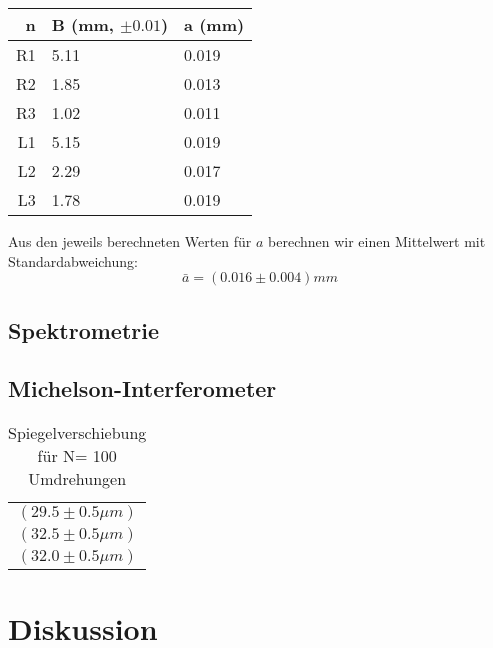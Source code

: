 \documentclass{article}
\begin{document}
\begin{center}
\begin{tabular}{|r|l|l|}
n & B (mm, $\pm 0.01$) & a (mm)\\
\hline
R1 & 5.11 & 0.019\\
R2 & 1.85 & 0.013\\
R3 & 1.02 & 0.011\\
L1 & 5.15 & 0.019\\
L2 & 2.29 & 0.017\\
L3 & 1.78 & 0.019\\
\end{tabular}

\end{center}
\vspace{1cm}
Aus den jeweils berechneten Werten für $a$ berechnen wir einen Mittelwert mit Standardabweichung:
$$\bar{a}=(0.016 \pm 0.004)mm$$

\subsection{Spektrometrie}
\subsection{Michelson-Interferometer}
\begin{table}
\caption{Spiegelverschiebung für N= 100 Umdrehungen}
\begin{tabular}{c}

$(29.5\pm 0.5 \mu m)$\\
$(32.5\pm 0.5 \mu m)$\\
$(32.0\pm 0.5 \mu m)$\\
\end{tabular}
\end{table}
\section{Diskussion}		
																								
\end{document}
